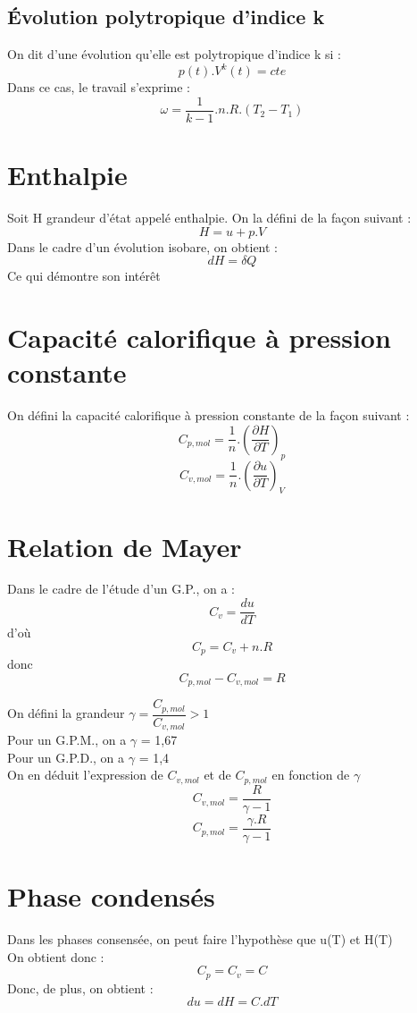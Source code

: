 \subsection{Évolution polytropique d'indice k}
On dit d'une évolution qu'elle est polytropique d'indice k si :
$$p(t).V^{k}(t) = cte$$
Dans ce cas, le travail s'exprime :
$$\omega = \dfrac{1}{k-1}.n.R.(T_2-T_1)$$
\section{Enthalpie}
\begin{de}
Soit H grandeur d'état appelé enthalpie. On la défini de la façon suivant : 
$$H = u+p.V$$
Dans le cadre d'un évolution isobare, on obtient :
$$dH = \delta Q$$
Ce qui démontre son intérêt
\end{de}
\section{Capacité calorifique à pression constante}
\begin{de}
On défini la capacité calorifique à pression constante de la façon suivant : 
$$C_{p,mol} = \dfrac{1}{n}.(\dfrac{\partial H}{\partial T})_p$$
$$C_{v,mol} = \dfrac{1}{n}.(\dfrac{\partial u}{\partial T})_V$$
\end{de}
\section{Relation de Mayer}
Dans le cadre de l'étude d'un G.P., on a : 
$$C_v = \dfrac{du}{dT}$$
d'où
$$C_p = C_v + n.R$$
donc
$$C_{p,mol} - C_{v,mol} = R$$
\begin{de}
On défini la grandeur $\gamma = \dfrac{C_{p,mol}}{C_{v,mol}} > 1$\\
Pour un G.P.M., on a $\gamma$ = 1,67\\
Pour un G.P.D., on a $\gamma$ = 1,4\\
On en déduit l'expression de $C_{v,mol}$ et de $C_{p,mol}$ en fonction de $\gamma$
$$C_{v,mol}=\dfrac{R}{\gamma - 1}$$
$$C_{p,mol}=\dfrac{\gamma.R}{\gamma - 1}$$
\end{de}
\section{Phase condensés}
\begin{de}
Dans les phases consensée, on peut faire l'hypothèse que u(T) et H(T) \\
On obtient donc :
$$C_p = C_v = C$$
Donc, de plus, on obtient :
$$du=dH=C.dT$$
\end{de}
